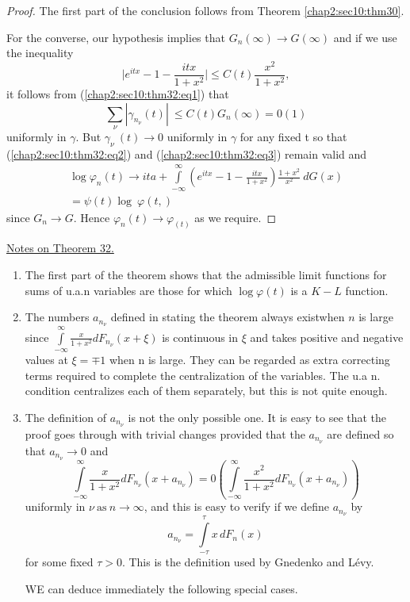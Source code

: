 \begin{proof}
The first part of the conclusion follows from
Theorem \ref{chap2:sec10:thm30}.

For the converse, our hypothesis implies that $G_n
(\infty)\rightarrow G(\infty)$ and if we use the inequality 
$$
\bigg|e^{itx}-1-\frac {i t x}{1+ x^2}\bigg|\leq C(t)\frac{x^2}{1+x^2},
$$
it follows from (\ref{chap2:sec10:thm32:eq1}) that 
$$
\sum\limits_\nu |\gamma_{n_\nu}(t)|~\leq C(t) G_n (\infty)=0(1) 
$$
uniformly in $\gamma$. But $\gamma_{\nu}~(t)\rightarrow 0$ uniformly in
$\gamma$ for any fixed t so that (\ref{chap2:sec10:thm32:eq2}) and
(\ref{chap2:sec10:thm32:eq3}) remain valid and 
\begin{gather*}
  \log \varphi_n(t)\rightarrow ita +
  \int\limits^{\infty}_{-\infty} (e^{itx}-1-\frac{itx}{1+x^2})
  \frac{1+x^2}{x^2}~d G(x) \\
  =\psi (t)\log~ \varphi(t,)
\end{gather*}
since $ G_n \rightarrow G$. Hence $\varphi_n(t)\rightarrow \varphi_(t)
$ as we require. 
 \end{proof}

\begin{description}
\item[\underline{Notes on Theorem 32.}]
\end{description}

\begin{enumerate}
\renewcommand{\theenumi}{\alph{enumi}}
\renewcommand{\labelenumi}{(\theenumi)}
\item The first part of the theorem shows that the admissible limit
  functions for sums of u.a.n variables are those for which $\log \varphi(t)$
  is a $K-L$ function.
  
\item The numbers $a_{n_\nu}$ defined in stating the theorem always 
  exist\pageoriginale when $n$ is large since $\int\limits^\infty_{-\infty}
  \frac{x}{1+x^2} d F_{n_\nu} (x+ \xi)$ is continuous in $\xi$ 
  and takes positive and negative values at $\xi =\mp 1$
  when n is large. They can be regarded  as extra correcting terms 
  required to complete the centralization of the variables. The u.a
  n. condition centralizes each of them separately, but this is not
  quite enough. 
  
\item The definition of $a_{n_\nu}$ is not the only possible one. It is 
  easy to see that the proof goes through with trivial changes provided
  that the $a_{n_\nu}$ are defined so that $a_{n_\nu} \rightarrow 0$ and 
  $$ 
  \int\limits^\infty_{- \infty} \frac{x}{1+x^2}d F_{n_\nu} (
  x+a_{n_\nu})= 0(\int\limits^\infty_{-\infty} \frac{x^2}{1+x^2}d
  F_{n_\nu} (x+a_{n_\nu}))
  $$
  uniformly in $\nu ~\text{as}~ n \rightarrow \infty$, and this is easy to
  verify if we define $a_{n_\nu}$ by 
  $$ 
  a_{n_\nu}= \int\limits^\tau _{-\tau} x \,d F_n(x)
  $$
  for some fixed $\tau > 0$.  This is the definition used by Gnedenko
  and L\'evy. 
   
  WE can deduce immediately the following special cases.
\end{enumerate}

